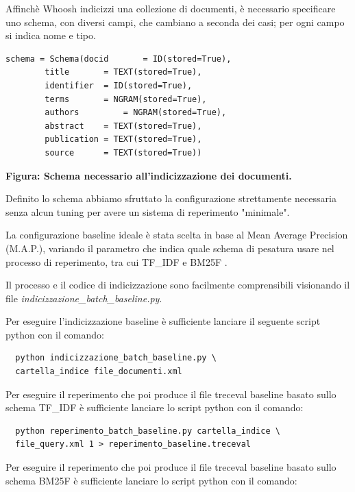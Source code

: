 \documentclass[runningheads]{llncs}
\begin{document}
Affinch\`e Whoosh indicizzi una collezione di documenti, \`e necessario
specificare uno schema, con diversi campi, che cambiano a seconda dei casi;
per ogni campo si indica  nome e tipo. \par

\begin{lstlisting}
schema = Schema(docid      	= ID(stored=True),
		title      	= TEXT(stored=True),
		identifier	= ID(stored=True),
		terms 		= NGRAM(stored=True),
		authors      	= NGRAM(stored=True),
		abstract 	= TEXT(stored=True),
		publication	= TEXT(stored=True),
		source 		= TEXT(stored=True))
\end{lstlisting}
\begin{tablenotes}
      \small
      \item \bf Figura: Schema necessario all'indicizzazione dei documenti.
    \end{tablenotes}


Definito lo schema abbiamo sfruttato la configurazione strettamente necessaria senza alcun tuning per avere
un sistema di reperimento "minimale".

La configurazione baseline ideale \`e stata scelta in base al Mean Average Precision (M.A.P.),\cite{WBC_map} variando il parametro che indica quale schema di
pesatura usare nel processo di reperimento, tra cui TF\_IDF e BM25F .

 Il processo e il codice di indicizzazione sono facilmente comprensibili visionando il file  \emph{indicizzazione\_batch\_baseline.py}. \par
\lstset{
  language=bash,
  basicstyle=\ttfamily
}

Per eseguire l'indicizzazione  baseline \`e sufficiente lanciare il seguente script python con il comando:
\begin{lstlisting}
  python indicizzazione_batch_baseline.py \
  cartella_indice file_documenti.xml
\end{lstlisting}

Per eseguire il reperimento che poi produce il file treceval baseline basato sullo schema TF\_IDF \`e sufficiente lanciare
lo script python con il comando:

\begin{lstlisting}
  python reperimento_batch_baseline.py cartella_indice \
  file_query.xml 1 > reperimento_baseline.treceval
\end{lstlisting}

Per eseguire il reperimento che poi produce il file treceval baseline basato sullo schema BM25F \`e sufficiente lanciare
lo script python con il comando:
\end{document}
